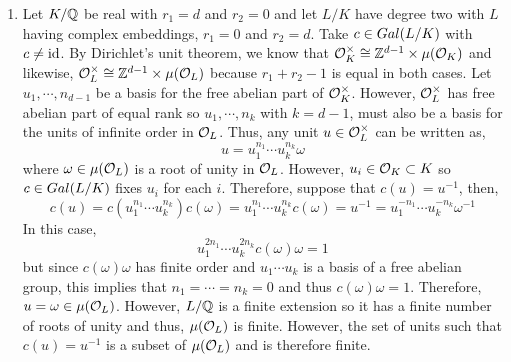 \documentclass[12pt]{extarticle}
\begin{document}
\begin{enumerate}
\item Let $K / \mathbb{Q}$ be real with $r_1 = d$ and $r_2 = 0$ and let $L / K $ have degree two with $L$ having complex embeddings, $r_1 = 0$ and $r_2 = d$. Take $c \in Gal \small(L/K \small)$ with $c \neq \mathrm{id}$. By Dirichlet's unit theorem, we know that $\mathcal{O}_{K}^\times \cong \mathbb{Z}^{d - 1} \times \mu(\mathcal{O}_{K})$ and likewise, $\mathcal{O}_{L}^\times \cong \mathbb{Z}^{d - 1} \times \mu(\mathcal{O}_{L})$ because $r_1 + r_2 - 1$ is equal in both cases. Let $u_1, \cdots, n_{d - 1}$ be a basis for the free abelian part of $\mathcal{O}_{K}^\times$. However, $\mathcal{O}_{L}^\times$ has free abelian part of equal rank so $u_1, \cdots, n_{k}$ with $k = d - 1$, must also be a basis for the units of infinite order in $\mathcal{O}_{L}$. Thus, any unit $u \in \mathcal{O}_{L}^\times$ can be written as,
\[ u = u_1^{n_1} \cdots u_{k}^{n_{k}} \omega \]
where $\omega \in \mu(\mathcal{O}_{L})$ is a root of unity in $\mathcal{O}_{L}$. However, $u_i \in \mathcal{O}_{K} \subset K$ so $c \in Gal \small(L/K \small)$ fixes $u_i$ for each $i$. Therefore, suppose that $c(u) = u^{-1}$, then,
\[c(u) = c(u_1^{n_1} \cdots u_{k}^{n_{k}}) c(\omega) = u_1^{n_1} \cdots u_{k}^{n_{k}} c(\omega) = u^{-1} = u_1^{-n_1} \cdots u_{k}^{-n_{k}} \omega^{-1} \]
In this case,
\[u_1^{2 n_1} \cdots u_{k}^{2n_{k}} c(\omega) \omega = 1 \]
but since $c(\omega) \omega$ has finite order and $u_1 \cdots u_k$ is a basis of a free abelian group, this implies that $n_1 = \cdots = n_k = 0$ and thus $c(\omega) \omega = 1$. Therefore, $u = \omega \in \mu(\mathcal{O}_{L})$. However, $L / \mathbb{Q}$ is a finite extension so it has a finite number of roots of unity and thus, $\mu(\mathcal{O}_{L})$ is finite. However, the set of units such that $c(u) = u^{-1}$ is a subset of $\mu(\mathcal{O}_{L})$ and is therefore finite.  
\end{enumerate}
\end{document}
